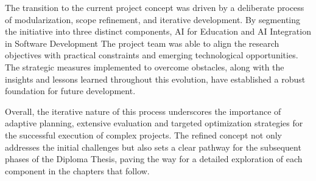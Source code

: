 The transition to the current project concept was driven by a deliberate process of modularization, scope refinement, 
and iterative development. By segmenting the initiative into three distinct components, AI for Education and AI Integration in Software Development 
The project team was able to align the research objectives with practical constraints and emerging technological opportunities. 
The strategic measures implemented to overcome obstacles, along with the insights and lessons learned throughout this evolution, 
have established a robust foundation for future development.

Overall, the iterative nature of this process underscores the importance of adaptive planning, 
extensive evaluation and targeted optimization strategies for the successful execution of complex projects. 
The refined concept not only addresses the initial challenges but also sets a clear pathway for the subsequent phases of the Diploma Thesis, 
paving the way for a detailed exploration of each component in the chapters that follow.


